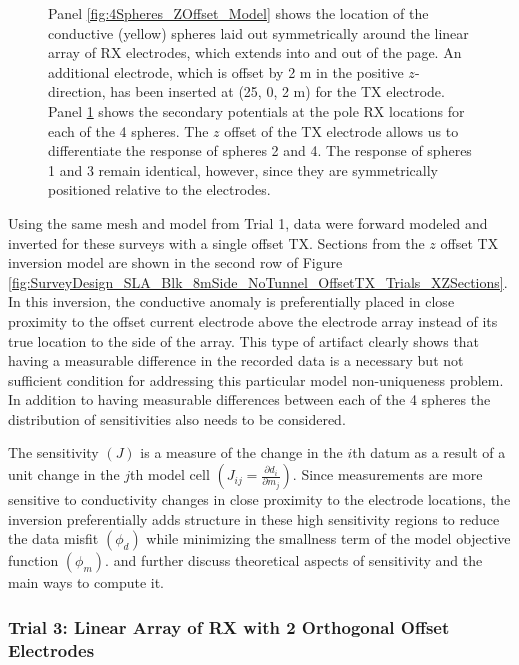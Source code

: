 \documentclass[preprint,authoryear,12pt]{elsarticle}
\begin{document}
\begin{figure}[htp]
\begin{center}
\begin{subfigure}{0.59\linewidth}
         \caption{}
         \label{fig:4Spheres_ZOffset_Vs}
      \end{subfigure}
   \end{center}
\caption{Panel \ref{fig:4Spheres_ZOffset_Model} shows the location of the conductive (yellow) spheres laid out symmetrically around the linear array of RX electrodes, which extends into and out of the page. An additional electrode, which is offset by 2 m in the positive $z$-direction, has been inserted at (25, 0, 2 m) for the TX electrode. Panel \ref{fig:4Spheres_ZOffset_Vs} shows the secondary potentials at the pole RX locations for each of the 4 spheres. The $z$ offset of the TX electrode allows us to differentiate the response of spheres 2 and 4. The response of spheres 1 and 3 remain identical, however, since they are symmetrically positioned relative to the electrodes.}
\label{fig:4Spheres_TX_ZOffset}
\end{figure}

Using the same mesh and model from Trial 1, data were forward modeled and inverted for these surveys with a single offset TX. Sections from the $z$ offset TX inversion model are shown in the second row of Figure \ref{fig:SurveyDesign_SLA_Blk_8mSide_NoTunnel_OffsetTX_Trials_XZSections}. In this inversion, the conductive anomaly is preferentially placed in close proximity to the offset current electrode above the electrode array instead of its true location to the side of the array. This type of artifact clearly shows that having a measurable difference in the recorded data is a necessary but not sufficient condition for addressing this particular model non-uniqueness problem. In addition to having measurable differences between each of the 4 spheres the distribution of sensitivities also needs to be considered.

The sensitivity $\left( J \right)$ is a measure of the change in the $i$th datum as a result of a unit change in the $j$th model cell $\left( J_{ij} = \frac{\partial d_i}{\partial m_j} \right)$. Since measurements are more sensitive to conductivity changes in close proximity to the electrode locations, the inversion preferentially adds structure in these high sensitivity regions to reduce the data misfit $\left( \phi_d \right)$ while minimizing the smallness term of the model objective function $\left( \phi_m \right)$. \citet{McGILLIVRAY1990} and \citet{Spitzer1998} further discuss theoretical aspects of sensitivity and the main ways to compute it.


\subsubsection{Trial 3: Linear Array of RX with 2 Orthogonal Offset Electrodes}
\label{sec:TheoreticalAnalysis_Trial3_2OrthogElecOffset}
\end{document}
